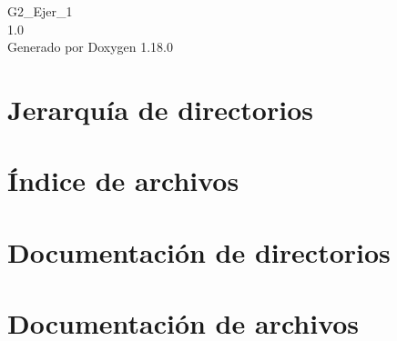 \documentclass[twoside]{book}
\newcommand{\+}{\discretionary{\mbox{\scriptsize$\hookleftarrow$}}{}{}}
\newcommand{\clearemptydoublepage}{%
    \newpage{\pagestyle{empty}\cleardoublepage}%
  }
\begin{document}
  \raggedbottom
    \hypersetup{pageanchor=false,
                bookmarksnumbered=true,
                pdfencoding=unicode
               }
  \begin{titlepage}
  \vspace*{7cm}
  \begin{center}%
  {\Large G2\+\_\+\+Ejer\+\_\+1}\\
  [1ex]\large 1.\+0 \\
  \vspace*{1cm}
  {\large Generado por Doxygen 1.18.0}\\
  \end{center}
  \end{titlepage}
  \clearemptydoublepage
  \tableofcontents
  \clearemptydoublepage
  \hypersetup{pageanchor=true}

\chapter{Jerarquía de directorios}

\chapter{Índice de archivos}

\chapter{Documentación de directorios}




\chapter{Documentación de archivos}


  \backmatter
  \newpage
  \clearemptydoublepage
  \printindex
\end{document}
